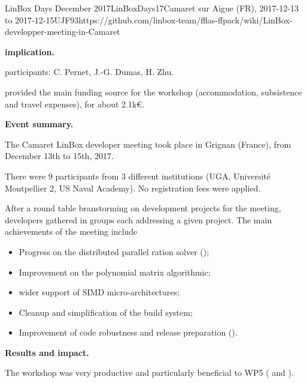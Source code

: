 \begin{event}{LinBox Days December 2017}{LinBoxDays17}{Camaret sur Aigue (FR),
2017-12-13 to 2017-12-15}{UJF}{9}{3}{https://github.com/linbox-team/fflas-ffpack/wiki/LinBox-developper-meeting-in-Camaret}

\textbf{\ODK implication.}

\ODK participants: C. Pernet, J.-G. Dumas, H. Zhu.

\ODK provided the main funding source for the workshop (accommodation,
subsistence and travel expenses), for about 2.1k\euro.

\textbf{Event summary.}

The Camaret LinBox developer meeting took place in Grignan (France), from December
13th to 15th, 2017.

There were 9 participants from 3 different institutions (UGA, Université
Montpellier 2, US Naval Academy).
No registration fees were applied.

After a round table branstorming on development projects for the meeting,
developers gathered in groups each addressing a given project.
The main achievements of the meeting include
\begin{itemize}
\item Progress on the distributed parallel ration solver ();
\item Improvement on the polynomial matrix algorithmic;
\item wider support of SIMD micro-architectures;
\item Cleanup and simplification of the build system;
\item Improvement of code robustness and release preparation ().
\end{itemize}


\textbf{Results and impact.}

The workshop was very productive and particularly beneficial to WP5
( and ).
\end{event}
